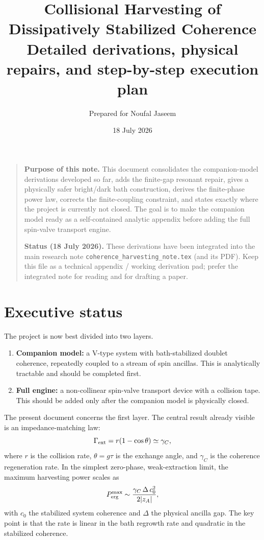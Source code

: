 \documentclass[11pt,a4paper]{article}
\title{\textbf{Collisional Harvesting of Dissipatively Stabilized Coherence}\\
\large Detailed derivations, physical repairs, and step-by-step execution plan}
\author{Prepared for Noufal Jaseem}
\date{18 July 2026}
\newenvironment{notebox}{\begin{quote}\small}{\end{quote}}
\begin{document}
\maketitle

\begin{notebox}
\textbf{Purpose of this note.} This document consolidates the companion-model derivations developed so far, adds the finite-gap resonant repair, gives a physically safer bright/dark bath construction, derives the finite-phase power law, corrects the finite-coupling constraint, and states exactly where the project is currently not closed. The goal is to make the companion model ready as a self-contained analytic appendix before adding the full spin-valve transport engine.

\textbf{Status (18 July 2026).} These derivations have been integrated into the main research note \texttt{coherence\_harvesting\_note.tex} (and its PDF). Keep this file as a technical appendix / working derivation pad; prefer the integrated note for reading and for drafting a paper.
\end{notebox}

\tableofcontents
\newpage

\section{Executive status}

The project is now best divided into two layers.

\begin{enumerate}
\item \textbf{Companion model:} a V-type system with bath-stabilized doublet coherence, repeatedly coupled to a stream of spin ancillas. This is analytically tractable and should be completed first.
\item \textbf{Full engine:} a non-collinear spin-valve transport device with a collision tape. This should be added only after the companion model is physically closed.
\end{enumerate}

The present document concerns the first layer. The central result already visible is an impedance-matching law:
\begin{equation}
\Gamma_{\rm ext}=r(1-\cos\theta)\simeq \gamma_C,
\end{equation}
where $r$ is the collision rate, $\theta=g\tau$ is the exchange angle, and $\gamma_C$ is the coherence regeneration rate. In the simplest zero-phase, weak-extraction limit, the maximum harvesting power scales as
\begin{equation}
P_{\rm erg}^{\rm max}\sim \frac{\gamma_C\,\Delta\,c_0^2}{2|z_A|},
\end{equation}
with $c_0$ the stabilized system coherence and $\Delta$ the physical ancilla gap. The key point is that the rate is linear in the bath regrowth rate and quadratic in the stabilized coherence.
\end{document}
